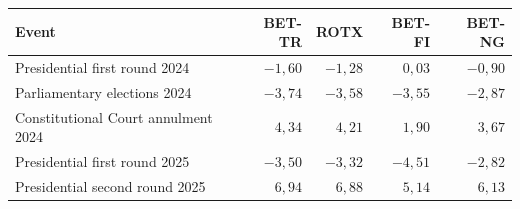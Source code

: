 \begin{tabular}{lrrrr}
\toprule
Event & BET-TR & ROTX & BET-FI & BET-NG \\
\midrule
Presidential first round 2024 & $-1{,}60$ & $-1{,}28$ & $0{,}03$ & $-0{,}90$ \\
Parliamentary elections 2024 & $-3{,}74$ & $-3{,}58$ & $-3{,}55$ & $-2{,}87$ \\
Constitutional Court annulment 2024 & $4{,}34$ & $4{,}21$ & $1{,}90$ & $3{,}67$ \\
Presidential first round 2025 & $-3{,}50$ & $-3{,}32$ & $-4{,}51$ & $-2{,}82$ \\
Presidential second round 2025 & $6{,}94$ & $6{,}88$ & $5{,}14$ & $6{,}13$ \\
\bottomrule
\end{tabular}
